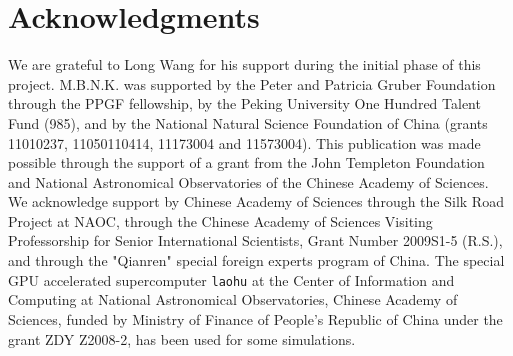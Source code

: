 \documentclass[usenatbib]{mn2e}
\begin{document}
\section*{Acknowledgments}
We are grateful to Long Wang for his support during the initial phase of this project.
M.B.N.K. was supported by the Peter and Patricia Gruber Foundation through the PPGF fellowship, by the Peking University One Hundred Talent Fund (985), and by the National Natural Science Foundation of China (grants 11010237, 11050110414, 11173004 and 11573004). 
This publication was made possible through the support of a grant from 
the John Templeton Foundation and National Astronomical Observatories of the
Chinese Academy of Sciences. 
We acknowledge support by Chinese Academy of Sciences through the Silk Road
Project at NAOC, through the Chinese Academy of Sciences Visiting Professorship for Senior International Scientists, Grant Number 2009S1-5 (R.S.), and through the "Qianren" special foreign experts program of China.
The special GPU accelerated supercomputer {\tt laohu} at the Center of Information and
Computing at National Astronomical Observatories, Chinese Academy of Sciences, funded by Ministry of Finance of People's Republic of China under the grant ZDY Z2008-2, has been used for some simulations. 





\clearpage
{}
 
 

\end{document}
